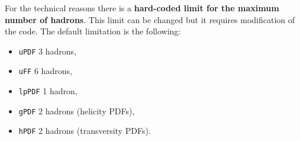 \documentclass[prd,nofootinbib,eqsecnum,final]{revtex4}
\renewcommand{\(}{\left(}
\renewcommand{\)}{\right)}
\renewcommand{\[}{\left[}
\renewcommand{\]}{\right]}
\newcommand{\red}[1]{{\color[rgb]{1,0,0} #1}}
\begin{document}
\begin{tcolorbox}
For the technical reasons there is a \red{\textbf{hard-coded limit for the maximum number of hadrons}}. This limit can be changed but it requires modification of the code. The default limitation is the following: 
\begin{itemize}
\item \texttt{uPDF} 3 hadrons, 
\item \texttt{uFF} 6 hadrons, 
\item \texttt{lpPDF} 1 hadron,
\item \texttt{gPDF} 2 hadrons (helicity PDFs), 
\item \texttt{hPDF} 2 hadrons (transversity PDFs).
\end{itemize}
\end{tcolorbox}
\end{document}
